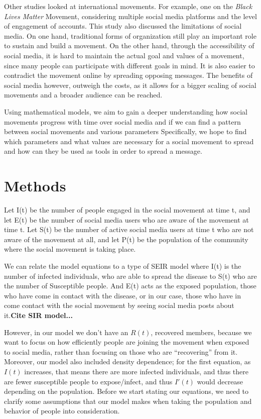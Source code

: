 \documentclass{article}
\begin{document}
    Other studies looked at international movements. For example, one on the \textit{Black Lives Matter} Movement, considering multiple social media platforms and the level of engagement of accounts. This study also discussed the limitations of social media. On one hand, traditional forms of organization still play an important role to sustain and build a movement. On the other hand, through the accessibility of social media, it is hard to maintain the actual goal and values of a movement, since many people can participate with different goals in mind. It is also easier to contradict the movement online by spreading opposing messages. The benefits of social media however, outweigh the costs, as it allows for a bigger scaling of social movements and a broader audience can be reached. \cite{mundt_scaling_2018}

    
    Using mathematical models, we aim to gain a deeper understanding how social movements progress with time over social media and if we can find a pattern between social movements and various parameters Specifically, we hope to find which parameters and what values are necessary for a social movement to spread and how can they be used as tools in order to spread a message.

    \section{Methods}

    

    Let I(t) be the number of people engaged in the social movement at time t, and let E(t) be the number of social media users who are aware of the movement at time t. Let S(t) be the number of active social media users at time t who are not aware of the movement at all, and let P(t) be the population of the community where the social movement is taking place. 
    
    We can relate the model equations to a type of SEIR model where I(t) is the number of infected individuals, who are able to spread the disease to S(t) who are the number of Susceptible people. And E(t) acts as the exposed population, those who have come in contact with the disease, or in our case, those who have in come contact with the social movement by seeing social media posts about it.\textbf{Cite SIR model...} 
    
    However, in our model we don’t have an $R(t)$, recovered members, because we want to focus on how efficiently people are joining the movement when exposed to social media, rather than focusing on those who are “recovering” from it. Moreover, our model also included density dependence; for the first equation, as $I(t)$ increases, that means there are more infected individuals, and thus there are fewer susceptible people to expose/infect, and thus $I'(t)$ would decrease depending on the population.
    Before we start stating our equations, we need to clarify some assumptions that our model makes when taking the population and behavior of people into consideration.
\end{document}
